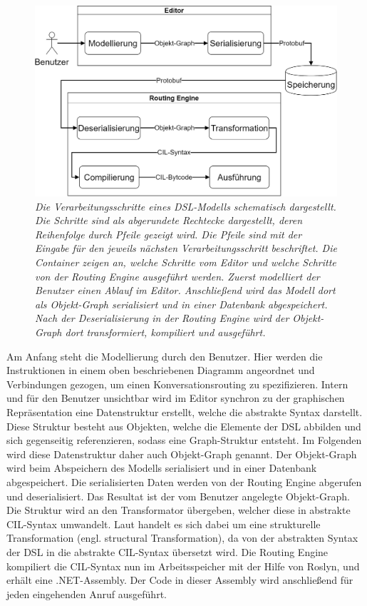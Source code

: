 \begin{figure} %
	\centering
		\includegraphics[width=\textwidth]{img/Verarbeitungsschritte.png}
	\caption[Verarbeitungsschritte eines DSL-Modells]{\textit{Die Verarbeitungsschritte eines DSL-Modells schematisch dargestellt. Die Schritte sind als abgerundete Rechtecke dargestellt, deren Reihenfolge durch Pfeile gezeigt wird. Die Pfeile sind mit der Eingabe für den jeweils nächsten Verarbeitungsschritt beschriftet. Die Container zeigen an, welche Schritte vom Editor und welche Schritte von der Routing Engine ausgeführt werden. Zuerst modelliert der Benutzer einen Ablauf im Editor. Anschließend wird das Modell dort als Objekt-Graph serialisiert und in einer Datenbank abgespeichert. Nach der Deserialisierung in der Routing Engine wird der Objekt-Graph dort transformiert, kompiliert und ausgeführt.}}
	\label{fig:Verarbeitungsschritte}
\end{figure}
\noindent Am Anfang steht die Modellierung durch den Benutzer. Hier werden die Instruktionen in einem oben beschriebenen Diagramm angeordnet und Verbindungen gezogen, um einen Konversationsrouting zu spezifizieren. Intern und für den Benutzer unsichtbar wird im Editor synchron zu der graphischen Repräsentation eine Datenstruktur erstellt, welche die abstrakte Syntax darstellt. Diese Struktur besteht aus Objekten, welche die Elemente der DSL abbilden und sich gegenseitig referenzieren, sodass eine Graph-Struktur entsteht. Im Folgenden wird diese Datenstruktur daher auch Objekt-Graph genannt. Der Objekt-Graph wird beim Abspeichern des Modells serialisiert und in einer Datenbank abgespeichert. Die serialisierten Daten werden von der Routing Engine abgerufen und deserialisiert. Das Resultat ist der vom Benutzer angelegte Objekt-Graph. Die Struktur wird an den Transformator übergeben, welcher diese in abstrakte CIL-Syntax umwandelt. Laut \cite[S. 72f]{Kleppe:09} handelt es sich dabei um eine strukturelle Transformation (engl. structural Transformation), da von der abstrakten Syntax der DSL in die abstrakte CIL-Syntax übersetzt wird. Die Routing Engine kompiliert die CIL-Syntax nun im Arbeitsspeicher mit der Hilfe von Roslyn, und erhält eine .NET-Assembly. Der Code in dieser Assembly wird anschließend für jeden eingehenden Anruf ausgeführt. 


